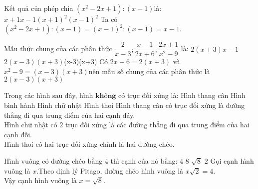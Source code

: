 \begin{ex}%
    Kết quả của phép chia 
    $(x^2-2x+1):(x-1)$là:\\
   \choice
   {$x+1$}{\True $x-1$}{$(x+1)^2$}{$(x-1)^2$}
 \loigiai
    {
    Ta có\\
    $(x^2-2x+1):(x-1)=(x-1)^2:(x-1)=x-1.$
    }
\end{ex}
\begin{ex}%
	Mẫu thức chung của các phân thức $\dfrac{2}{x-3};\dfrac{x-1}{2x+6};\dfrac{2x+1}{x^2-9}$ là:
	\choice
	{$2(x+3)$}{$x-1$}{\True $2(x-3)(x+3)$}{(x-3)(x+3)}
	\loigiai
	{
	Có $2x+6=2(x+3)$ và $x^2-9=(x-3)(x+3)$nên mẫu số chung của các phân thức là $2(x-3)(x+3)$
}
\end{ex}
\begin{ex}%
	Trong các hình sau đây, hình  $\textbf{không}$ có trục đối xứng là:
\choice
{Hình thang cân}
{\True Hình bình hành}
{Hình chữ nhật}
{Hình thoi}
\loigiai
{Hình thang cân có trục đối xứng là đường thẳng đi qua trung điểm của hai cạnh đáy.\\
Hình chữ nhật có $2$ trục đối xứng là các đường thẳng đi qua trung điểm của hai cạnh đối.\\
Hình thoi có hai trục đối xứng chính là hai đường chéo.}
\end{ex}
\begin{ex}%
	Hình vuông có đường chéo bằng $4$ thì cạnh của nó bằng:
\choice
{$4$}
{$8$}
{\True $\sqrt{8}$}
{$2$}
\loigiai
{
Gọi cạnh hình vuông là $x$.Theo định lý Pitago, đường chéo hình vuông là $x\sqrt{2}=4$.\\Vậy cạnh hình vuông là $x=\sqrt{8}$.}
\end{ex}

